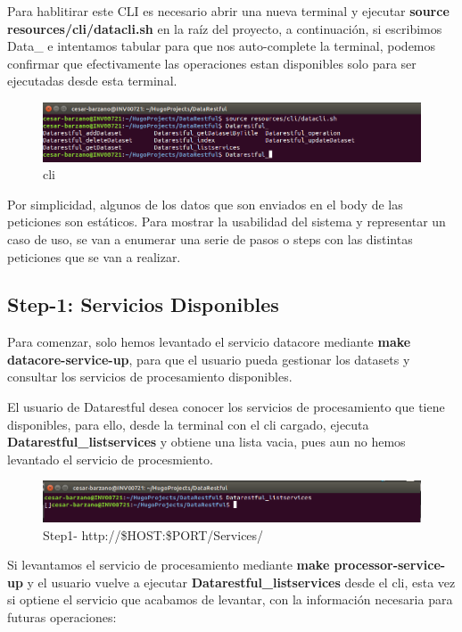\documentclass[a4paper,11pt]{book}
\begin{document}
Para hablitirar este CLI es necesario abrir una nueva terminal y ejecutar \textbf{source resources/cli/datacli.sh} en la raíz del proyecto, a continuación, si escribimos Data\_ e intentamos tabular para que nos auto-complete la terminal, podemos confirmar que efectivamente las operaciones estan disponibles solo para ser ejecutadas desde esta terminal.  

\begin{figure}[H]  
\centering 
\includegraphics[scale=0.35]{imagenes/cli.png}
\caption{ cli }  
\end{figure} 


Por simplicidad, algunos de los datos que son enviados en el body de las peticiones son estáticos. Para mostrar la usabilidad del sistema y representar un caso de uso, se van a enumerar una serie de pasos o steps con las distintas peticiones que se van a realizar.  

\subsection{Step-1: Servicios Disponibles}

Para comenzar, solo hemos levantado el servicio datacore mediante \textbf{make datacore-service-up}, para que el usuario pueda gestionar los datasets y consultar los servicios de procesamiento disponibles.

El usuario de Datarestful desea conocer los servicios de procesamiento que tiene disponibles, para ello, desde la terminal con el cli cargado, ejecuta \textbf{Datarestful\_listservices} y obtiene una lista vacia, pues aun no hemos levantado el servicio de procesmiento.  

\begin{figure}[H]  
\centering 
\includegraphics[scale=0.35]{imagenes/list_services.png}
\caption{ Step1- http://\$HOST:\$PORT/Services/ }  
\end{figure} 


Si levantamos el servicio de procesamiento mediante \textbf{make processor-service-up} y el usuario vuelve a ejecutar \textbf{Datarestful\_listservices} desde el cli, esta vez si optiene el servicio que acabamos de levantar, con la información necesaria para futuras operaciones: 
\end{document}
